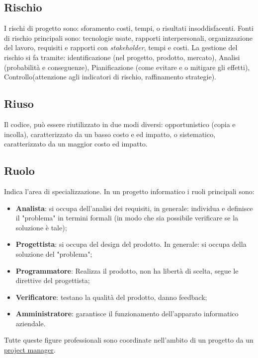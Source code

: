 	
	\subsection{Rischio}
	\label{sec:rischio}
	I rischi di progetto sono: sforamento costi, tempi, o risultati insoddisfacenti. Fonti di rischio principali sono:
	tecnologie usate, rapporti interpersonali, organizzazione del lavoro, requisiti e rapporti con  \emph{stakeholder}, tempi e costi.
	La gestione del rischio si fa tramite:
	identificazione (nel progetto, prodotto, mercato), Analisi (probabilità e conseguenze), Pianificazione (come evitare e o mitigare gli effetti), Controllo(attenzione agli indicatori di rischio, raffinamento strategie).

	
	\subsection{Riuso}
	\label{sec:riuso}
	Il codice, può essere riutilizzato in due modi diversi: opportunistico (copia e incolla), caratterizzato da un basso costo e ed impatto, o sistematico, caratterizzato da un maggior costo ed impatto.

	
	\subsection{Ruolo}
	\label{sec:ruolo}
	Indica l'area di specializzazione.
	In un progetto informatico i ruoli principali sono:
	\begin{itemize}
	\item \textbf{Analista}: si occupa dell'analisi dei requisiti, in generale: individua e definisce il "problema" in termini formali (in modo che sia possibile verificare se la soluzione è tale);
	\item \textbf{Progettista}: si occupa del design del prodotto. In generale: si occupa della soluzione del "problema";
	\item \textbf{Programmatore}: Realizza il prodotto, non ha libertà di scelta, segue le direttive del progettista;
	\item \textbf{Verificatore}: testano la qualità del prodotto, danno feedback;
	\item \textbf{Amministratore}: garantisce il funzionamento dell'apparato informatico aziendale.
	\end{itemize}
	Tutte queste figure professionali sono coordinate nell'ambito di un progetto da un \underline{\hyperref[sec:projectmanager]{project manager}}.
	
	
	\newpage

